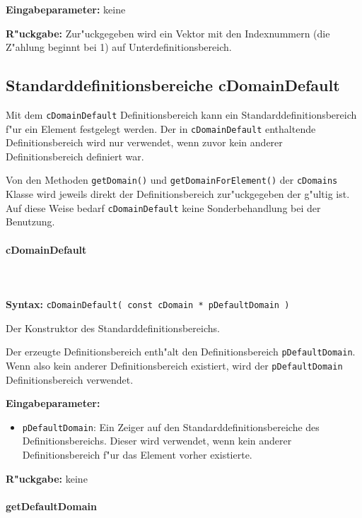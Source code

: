 \bigskip\noindent
\textbf{Eingabeparameter:} keine

\bigskip\noindent
\textbf{R"uckgabe:} Zur"uckgegeben wird ein Vektor mit den Indexnummern (die Z"ahlung beginnt bei 1) auf Unterdefinitionsbereich.



\subsection{Standarddefinitionsbereiche cDomainDefault}

Mit dem \verb|cDomainDefault| Definitionsbereich kann ein Standarddefinitionsbereich f"ur ein Element festgelegt werden. Der in \verb|cDomainDefault| enthaltende Definitionsbereich wird nur verwendet, wenn zuvor kein anderer Definitionsbereich definiert war.

Von den Methoden \verb|getDomain()| und \verb|getDomainForElement()| der \verb|cDomains| Klasse wird jeweils direkt der Definitionsbereich zur"uckgegeben der g"ultig ist. Auf diese Weise bedarf \verb|cDomainDefault| keine Sonderbehandlung bei der Benutzung.


\paragraph{cDomainDefault}

\ \\\\\noindent
\textbf{Syntax:} \verb|cDomainDefault( const cDomain * pDefaultDomain )|

\bigskip\noindent
Der Konstruktor des Standarddefinitionsbereichs.

Der erzeugte Definitionsbereich enth"alt den Definitionsbereich \verb|pDefaultDomain|. Wenn also kein anderer Definitionsbereich existiert, wird der \verb|pDefaultDomain| Definitionsbereich verwendet.

\bigskip\noindent
\textbf{Eingabeparameter:}
\begin{itemize}
 \item \verb|pDefaultDomain|: Ein Zeiger auf den Standarddefinitionsbereiche des Definitionsbereichs. Dieser wird verwendet, wenn kein anderer Definitionsbereich f"ur das Element vorher existierte.
\end{itemize}

\bigskip\noindent
\textbf{R"uckgabe:} keine


\paragraph{getDefaultDomain}

